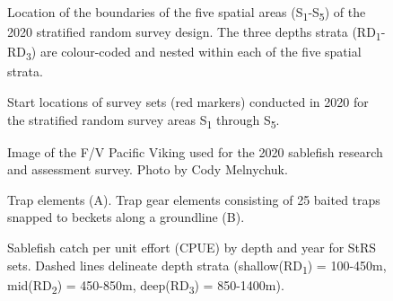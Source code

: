 \documentclass[12pt]{article}\usepackage[]{graphicx}\usepackage[]{color}
\begin{document}
\begin{figure}[htb]

{\centering {} 

}

\caption{Location of the boundaries of the five spatial areas (S\textsubscript{1}-S\textsubscript{5}) of the 2020 stratified random survey design. The three depths strata (RD\textsubscript{1}-RD\textsubscript{3}) are colour-coded and nested within each of the five spatial strata.}\label{fig:figure1}
\end{figure}
\clearpage


\begin{figure}[htb]

{\centering {} 

}

\caption{Start locations of survey sets (red markers) conducted in 2020 for the stratified random survey areas S\textsubscript{1} through S\textsubscript{5}.}\label{fig:figure2}
\end{figure}
\clearpage


\begin{figure}[htb]

{\centering {} 

}

\caption{Image of the F/V Pacific Viking used for the 2020 sablefish research and assessment survey. Photo by Cody Melnychuk.}\label{fig:figure3}
\end{figure}
\clearpage


\begin{figure}[htb]

{\centering {} 

}

\caption{Trap elements (A). Trap gear elements consisting of 25 baited traps snapped to beckets along a groundline (B).}\label{fig:figure4}
\end{figure}
\clearpage


\begin{figure}[htb]

{\centering {} 

}

\caption{Sablefish catch per unit effort (CPUE) by depth and year for StRS sets. Dashed lines delineate depth strata (shallow(RD\textsubscript{1}) = 100-450m, mid(RD\textsubscript{2}) = 450-850m, deep(RD\textsubscript{3}) = 850-1400m).}\label{fig:figure5}
\end{figure}
\clearpage
\end{document}
